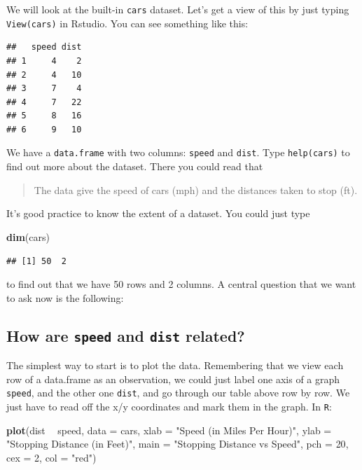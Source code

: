 \documentclass[]{book}
\newenvironment{Shaded}{\begin{snugshade}}{\end{snugshade}}
\newcommand{\KeywordTok}[1]{\textcolor[rgb]{0.13,0.29,0.53}{\textbf{#1}}}
\newcommand{\DataTypeTok}[1]{\textcolor[rgb]{0.13,0.29,0.53}{#1}}
\newcommand{\DecValTok}[1]{\textcolor[rgb]{0.00,0.00,0.81}{#1}}
\newcommand{\StringTok}[1]{\textcolor[rgb]{0.31,0.60,0.02}{#1}}
\newcommand{\OperatorTok}[1]{\textcolor[rgb]{0.81,0.36,0.00}{\textbf{#1}}}
\newcommand{\NormalTok}[1]{#1}
\begin{document}
We will look at the built-in \texttt{cars} dataset. Let's get a view of
this by just typing \texttt{View(cars)} in Rstudio. You can see
something like this:

\begin{verbatim}
##   speed dist
## 1     4    2
## 2     4   10
## 3     7    4
## 4     7   22
## 5     8   16
## 6     9   10
\end{verbatim}

We have a \texttt{data.frame} with two columns: \texttt{speed} and
\texttt{dist}. Type \texttt{help(cars)} to find out more about the
dataset. There you could read that

\begin{quote}
The data give the speed of cars (mph) and the distances taken to stop
(ft).
\end{quote}

It's good practice to know the extent of a dataset. You could just type

\begin{Shaded}
\begin{Highlighting}[]
\KeywordTok{dim}\NormalTok{(cars)}
\end{Highlighting}
\end{Shaded}

\begin{verbatim}
## [1] 50  2
\end{verbatim}

to find out that we have 50 rows and 2 columns. A central question that
we want to ask now is the following:

\subsection{\texorpdfstring{How are \texttt{speed} and \texttt{dist}
related?}{How are speed and dist related?}}\label{how-are-speed-and-dist-related}

The simplest way to start is to plot the data. Remembering that we view
each row of a data.frame as an observation, we could just label one axis
of a graph \texttt{speed}, and the other one \texttt{dist}, and go
through our table above row by row. We just have to read off the x/y
coordinates and mark them in the graph. In \texttt{R}:

\begin{Shaded}
\begin{Highlighting}[]
\KeywordTok{plot}\NormalTok{(dist }\OperatorTok{~}\StringTok{ }\NormalTok{speed, }\DataTypeTok{data =}\NormalTok{ cars,}
     \DataTypeTok{xlab =} \StringTok{"Speed (in Miles Per Hour)"}\NormalTok{,}
     \DataTypeTok{ylab =} \StringTok{"Stopping Distance (in Feet)"}\NormalTok{,}
     \DataTypeTok{main =} \StringTok{"Stopping Distance vs Speed"}\NormalTok{,}
     \DataTypeTok{pch  =} \DecValTok{20}\NormalTok{,}
     \DataTypeTok{cex  =} \DecValTok{2}\NormalTok{,}
     \DataTypeTok{col  =} \StringTok{"red"}\NormalTok{)}
\end{Highlighting}
\end{Shaded}
\end{document}
